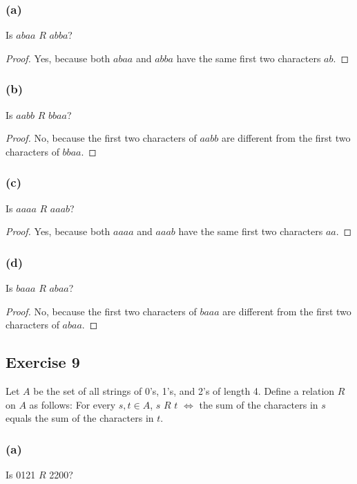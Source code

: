 \documentclass[14pt]{extarticle}
\begin{document}
\subsubsection{(a)}
Is $abaa$ $R$ $abba$?

\begin{proof}
Yes, because both $abaa$ and $abba$ have the same first two characters $ab$.
\end{proof}

\subsubsection{(b)}
Is $aabb$ $R$ $bbaa$?

\begin{proof}
No, because the first two characters of $aabb$ are different from the first two characters of $bbaa$.
\end{proof}

\subsubsection{(c)}
Is $aaaa$ $R$ $aaab$?

\begin{proof}
Yes, because both $aaaa$ and $aaab$ have the same first two characters $aa$.
\end{proof}

\subsubsection{(d)}
Is $baaa$ $R$ $abaa$?

\begin{proof}
No, because the first two characters of $baaa$ are different from the first two characters of $abaa$.
\end{proof}

\subsection{Exercise 9}
Let $A$ be the set of all strings of 0’s, 1’s, and 2’s of length 4. Define a relation $R$ on $A$ as follows: For 
every \(s, t \in A\), $s$ $R$ $t$ $\iff$ the sum of the characters in $s$ equals the sum of the characters in $t$.

\subsubsection{(a)}
Is 0121 $R$ 2200?
\end{document}
